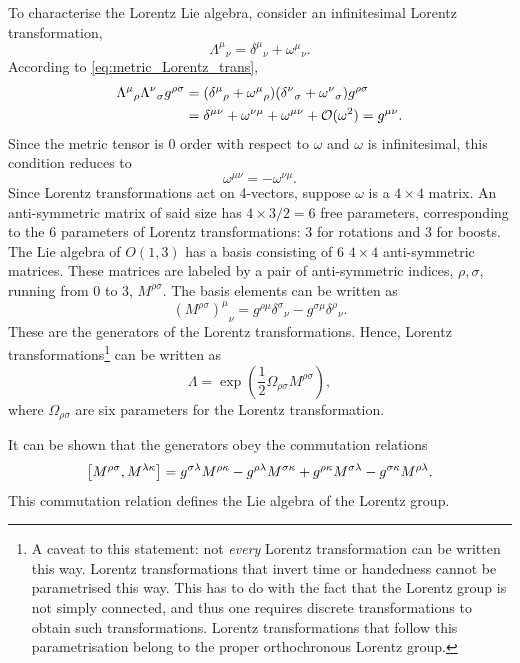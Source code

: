 To characterise the Lorentz Lie algebra, consider an infinitesimal Lorentz transformation, $${\Lambda^{\mu}}_{\nu} = {\delta^{\mu}}_\nu+{\omega^\mu}_\nu.$$ According to \eqref{eq:metric_Lorentz_trans},
\begin{align*}
    {\Lambda^{\mu}}_{\rho}{\Lambda^{\nu}}_{\sigma} g^{\rho\sigma} &= \qty({\delta^{\mu}}_\rho+{\omega^\mu}_\rho)\qty({\delta^{\nu}}_\sigma+{\omega^\nu}_\sigma) g^{\rho\sigma}\\
    &= \delta^{\mu\nu}+\omega^{\nu\mu}+\omega^{\mu\nu}+\mathcal{O}(\omega^2) = g^{\mu\nu}.
\end{align*}
Since the metric tensor is 0 order with respect to $\omega$ and $\omega$ is infinitesimal, this condition reduces to $$ \omega^{\mu\nu} = -\omega^{\nu\mu}.$$ Since Lorentz transformations act on 4-vectors, suppose $\omega$ is a $4\times 4$ matrix. An anti-symmetric matrix of said size has $4\times 3/2 = 6$ free parameters, corresponding to the 6 parameters of Lorentz transformations: 3 for rotations and 3 for boosts. The Lie algebra of $O(1,3)$ has a basis consisting of 6 $4\times 4$ anti-symmetric matrices. These matrices are labeled by a pair of anti-symmetric indices, $\rho,\sigma$, running from 0 to 3, $M^{\rho\sigma}$. The basis elements can be written as $${(M^{\rho\sigma})^{\mu}}_\nu = g^{\rho\mu}{\delta^{\sigma}}_\nu-g^{\sigma\mu}{\delta^{\rho}}_{\nu}.$$ These are the generators of the Lorentz transformations. Hence, Lorentz transformations\footnote{A caveat to this statement: not \textit{every} Lorentz transformation can be written this way. Lorentz transformations that invert time or handedness cannot be parametrised this way. This has to do with the fact that the Lorentz group is not simply connected, and thus one requires discrete transformations to obtain such transformations. Lorentz transformations that follow this parametrisation belong to the proper orthochronous Lorentz group.} can be written as $$\Lambda = \exp(\frac{1}{2}\Omega_{\rho\sigma}M^{\rho\sigma}), $$ where $\Omega_{\rho\sigma}$ are six parameters for the Lorentz transformation.

It can be shown that the generators obey the commutation relations 
\begin{equation}\label{eq:Lorentz-algebra}
    \comm{M^{\rho\sigma}}{M^{\lambda \kappa}} = g^{\sigma\lambda}M^{\rho\kappa}-g^{\rho\lambda}M^{\sigma\kappa}+g^{\rho\kappa}M^{\sigma\lambda}-g^{\sigma\kappa}M^{\rho\lambda}.
\end{equation}
This commutation relation defines the Lie algebra of the Lorentz group.

